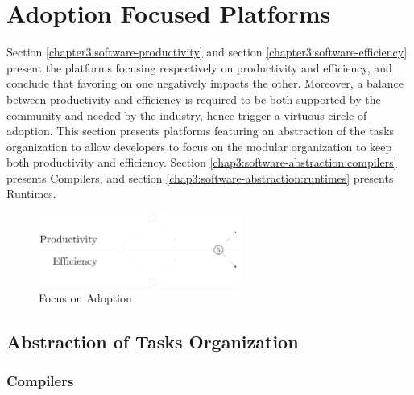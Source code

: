 \section{Adoption Focused Platforms} \label{chapter3:software-abstraction}

Section \ref{chapter3:software-productivity} and section \ref{chapter3:software-efficiency} present the platforms focusing respectively on productivity and efficiency, and conclude that favoring on one negatively impacts the other.
Moreover, a balance between productivity and efficiency is required to be both supported by the community and needed by the industry, hence trigger a virtuous circle of adoption.
This section presents platforms featuring an abstraction of the tasks organization to allow developers to focus on the modular organization to keep both productivity and efficiency.
Section \ref{chap3:software-abstraction:compilers} presents Compilers, and section \ref{chap3:software-abstraction:runtimes} presents Runtimes.


\begin{figure}[!h]
\begin{center}
\includegraphics[width=0.6\textwidth]{../ressources/state-of-the-art-5.pdf}
\end{center}
\caption{Focus on Adoption}
\label{fig:state-of-the-art-5}
\end{figure}

\subsection{Abstraction of Tasks Organization}

\subsubsection{Compilers} \label{chapter3:software-abstraction:compilers}

